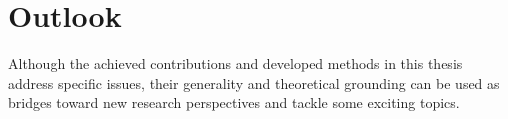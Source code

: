 \section*{Outlook}
Although the achieved contributions and developed methods in this thesis address specific issues, their generality and theoretical grounding can be used as bridges toward new research perspectives and tackle some exciting topics. 
